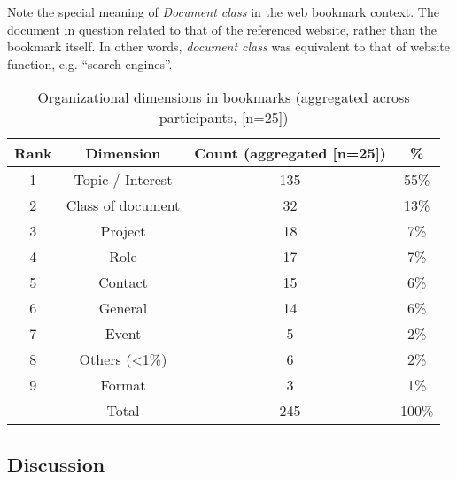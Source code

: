 Note the special meaning of \textit{Document class} in the web bookmark context. The document in question related to that of the referenced website, rather than the bookmark itself. In other words, \textit{document class} was equivalent to that of website function, e.g. ``search engines''.

\begin{table}[btp]
\begin{center}
\begin{footnotesize}
\setlength{\extrarowheight}{2pt}
\begin{tabular}{|c|c|c|c|}
\hline
{\bf Rank} & {\bf Dimension} & {\bf Count (aggregated [n=25])} &   {\bf \%} \\
\hline
         1 & Topic / Interest &        135 &       55\% \\
\hline
         2 & Class of document &         32 &       13\% \\
\hline
         3 &    Project &         18 &        7\% \\
\hline
         4 &       Role &         17 &        7\% \\
\hline
         5 &    Contact &         15 &        6\% \\
\hline
         6 &    General &         14 &        6\% \\
\hline
         7 &      Event &          5 &        2\% \\
\hline
         8 & Others (<1\%) &          6 &        2\% \\
\hline
         9 &     Format &          3 &        1\% \\
\hline
           &      Total &        245 &      100\% \\
\hline
\end{tabular}  
\end{footnotesize}
\caption{Organizational dimensions in bookmarks (aggregated across participants, [n=25])}
\label{table:exp-study:bookmark-org-dims}
\end{center}
\end{table}

\subsection{Discussion}

